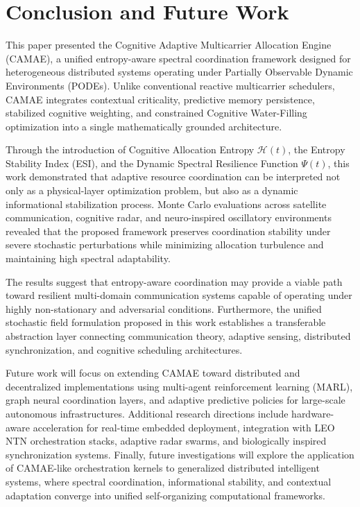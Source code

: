 \documentclass[journal,10pt,twocolumn,twoside]{IEEEtran}
\begin{document}
\section{Conclusion and Future Work}
\label{sec:conclusion}

This paper presented the Cognitive Adaptive Multicarrier Allocation Engine (CAMAE), a unified entropy-aware spectral coordination framework designed for heterogeneous distributed systems operating under Partially Observable Dynamic Environments (PODEs). Unlike conventional reactive multicarrier schedulers, CAMAE integrates contextual criticality, predictive memory persistence, stabilized cognitive weighting, and constrained Cognitive Water-Filling optimization into a single mathematically grounded architecture.

Through the introduction of Cognitive Allocation Entropy $\mathcal{H}(t)$, the Entropy Stability Index (ESI), and the Dynamic Spectral Resilience Function $\Psi(t)$, this work demonstrated that adaptive resource coordination can be interpreted not only as a physical-layer optimization problem, but also as a dynamic informational stabilization process. Monte Carlo evaluations across satellite communication, cognitive radar, and neuro-inspired oscillatory environments revealed that the proposed framework preserves coordination stability under severe stochastic perturbations while minimizing allocation turbulence and maintaining high spectral adaptability.

The results suggest that entropy-aware coordination may provide a viable path toward resilient multi-domain communication systems capable of operating under highly non-stationary and adversarial conditions. Furthermore, the unified stochastic field formulation proposed in this work establishes a transferable abstraction layer connecting communication theory, adaptive sensing, distributed synchronization, and cognitive scheduling architectures.

Future work will focus on extending CAMAE toward distributed and decentralized implementations using multi-agent reinforcement learning (MARL), graph neural coordination layers, and adaptive predictive policies for large-scale autonomous infrastructures. Additional research directions include hardware-aware acceleration for real-time embedded deployment, integration with LEO NTN orchestration stacks, adaptive radar swarms, and biologically inspired synchronization systems. Finally, future investigations will explore the application of CAMAE-like orchestration kernels to generalized distributed intelligent systems, where spectral coordination, informational stability, and contextual adaptation converge into unified self-organizing computational frameworks.



\end{document}

